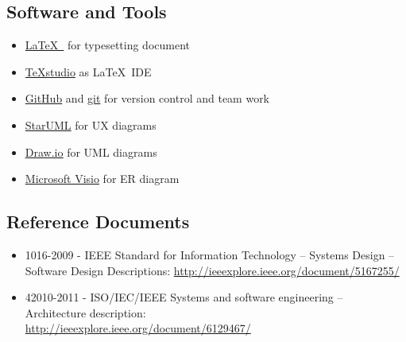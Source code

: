 \subsection{Software and Tools}
	\begin{itemize}
	\item
		\underline{\LaTeX\ } for typesetting document
	\item
		\underline{TeXstudio} as \LaTeX\ IDE
	\item
		\underline{GitHub} and \underline{git} for version control and team work
	\item
		\underline{StarUML} for UX diagrams
	\item
		\href{https://draw.io}{\underline{Draw.io}} for UML diagrams
	\item
		\underline{Microsoft Visio} for ER diagram
	\end{itemize}
\subsection{Reference Documents}
	\begin{itemize}
		\item 1016-2009 - IEEE Standard for Information Technology -- Systems Design -- Software Design Descriptions: \href{http://ieeexplore.ieee.org/document/5167255/}{http://ieeexplore.ieee.org/document/5167255/}

		\item 42010-2011 - ISO/IEC/IEEE Systems and software engineering -- Architecture description:
		\\%
		 \href{http://ieeexplore.ieee.org/document/6129467/}{http://ieeexplore.ieee.org/document/6129467/}
	\end{itemize}